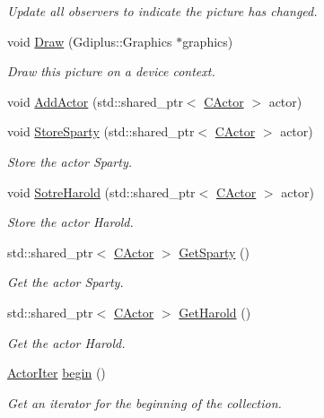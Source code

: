 \begin{DoxyCompactItemize}
\begin{DoxyCompactList}\small\item\em Update all observers to indicate the picture has changed. \end{DoxyCompactList}\item 
void \hyperlink{class_c_picture_aca6a4829388fdfe3ecdc42f0e788b712}{Draw} (Gdiplus\+::\+Graphics $\ast$graphics)
\begin{DoxyCompactList}\small\item\em Draw this picture on a device context. \end{DoxyCompactList}\item 
void \hyperlink{class_c_picture_a90799f3ea10ffea8fbb0ea2b9d24a525}{Add\+Actor} (std\+::shared\+\_\+ptr$<$ \hyperlink{class_c_actor}{C\+Actor} $>$ actor)
\item 
void \hyperlink{class_c_picture_aa2e0537582432bfafe5f755169bd6c3d}{Store\+Sparty} (std\+::shared\+\_\+ptr$<$ \hyperlink{class_c_actor}{C\+Actor} $>$ actor)
\begin{DoxyCompactList}\small\item\em Store the actor Sparty. \end{DoxyCompactList}\item 
void \hyperlink{class_c_picture_a70c9f1cbbd26ad632161abab5d1e9411}{Sotre\+Harold} (std\+::shared\+\_\+ptr$<$ \hyperlink{class_c_actor}{C\+Actor} $>$ actor)
\begin{DoxyCompactList}\small\item\em Store the actor Harold. \end{DoxyCompactList}\item 
std\+::shared\+\_\+ptr$<$ \hyperlink{class_c_actor}{C\+Actor} $>$ \hyperlink{class_c_picture_a1da71eb028f389a204ade107153c07c2}{Get\+Sparty} ()
\begin{DoxyCompactList}\small\item\em Get the actor Sparty. \end{DoxyCompactList}\item 
std\+::shared\+\_\+ptr$<$ \hyperlink{class_c_actor}{C\+Actor} $>$ \hyperlink{class_c_picture_a61b6093301d6b0b1c626b5669c1ba47a}{Get\+Harold} ()
\begin{DoxyCompactList}\small\item\em Get the actor Harold. \end{DoxyCompactList}\item 
\hyperlink{class_c_picture_1_1_actor_iter}{Actor\+Iter} \hyperlink{class_c_picture_a8461cc11cc1ce334b4cf92e2ee4a4ebe}{begin} ()
\begin{DoxyCompactList}\small\item\em Get an iterator for the beginning of the collection. \end{DoxyCompactList}\item 

\end{DoxyCompactItemize}
